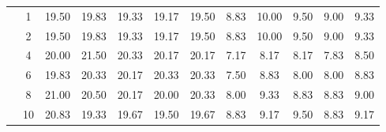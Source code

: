\begin{table}[htpb]
\begin{tabular}{|c|c|c c c c c|c c c c c|}
\multicolumn{1}{|c|}{ \multirow{6}{*}{\rotatebox[origin=c]{90}{\textbf{K-vizinhos}}} }
&1	&19.50&	19.83&	19.33	&19.17&	19.50	&8.83	&10.00	&9.50&	9.00&	9.33	\\\cline{2-12}
&2	&19.50&	19.83&	19.33	&19.17&	19.50	&8.83	&10.00	&9.50&	9.00&	9.33	\\\cline{2-12}
&4	&20.00	&21.50	&20.33	&20.17	&20.17	&7.17&	8.17	&8.17&	7.83&	8.50	\\\cline{2-12}
&6	&19.83	&20.33	&20.17	&20.33	&20.33	&7.50&	8.83	&8.00&	8.00&	8.83	\\\cline{2-12}
&8	&21.00	&20.50	&20.17	&20.00	&20.33	&8.00&	9.33	&8.83&	8.83&	9.00	\\\cline{2-12}
&10	&20.83	&19.33	&19.67	&19.50	&19.67	&8.83&	9.17	&9.50&	8.83&	9.17	


\\\midrule

	\end{tabular}
\end{table}



